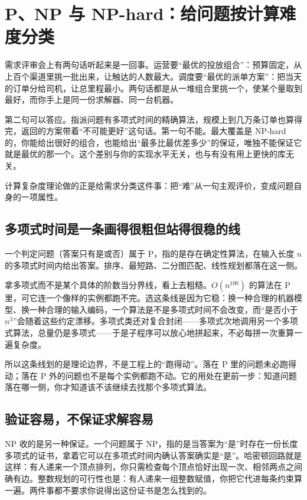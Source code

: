\section{P、NP 与 NP-hard：给问题按计算难度分类}
\label{sec:09-Convex-Optimization/09-Complexity-and-Approximation/01}

需求评审会上有两句话听起来是一回事。运营要``最优的投放组合''：预算固定，从上百个渠道里挑一批出来，让触达的人数最大。调度要``最优的派单方案''：把当天的订单分给司机，让总里程最小。两句话都是从一堆组合里挑一个，使某个量取到最好，而你手上是同一份求解器、同一台机器。

第二句可以答应。指派问题有多项式时间的精确算法，规模上到几万条订单也算得完，返回的方案带着``不可能更好''这句话。第一句不能。最大覆盖是 NP-hard 的，你能给出很好的组合，也能给出``最多比最优差多少''的保证，唯独不能保证它就是最优的那一个。这个差别与你的实现水平无关，也与有没有用上更快的库无关。

计算复杂度理论做的正是给需求分类这件事：把``难''从一句主观评价，变成问题自身的一项属性。

\subsection{多项式时间是一条画得很粗但站得很稳的线}

一个判定问题（答案只有是或否）属于 P，指的是存在确定性算法，在输入长度 \(n\) 的多项式时间内给出答案。排序、最短路、二分图匹配、线性规划都落在这一侧。

拿多项式而不是某个具体的阶数当分界线，看上去粗糙。\(O(n^{100})\) 的算法在 P 里，可它连一个像样的实例都跑不完。选这条线是因为它稳：换一种合理的机器模型、换一种合理的输入编码，一个算法是不是多项式时间不会改变，而``是否小于 \(n^3\)''会随着这些约定漂移。多项式类还对复合封闭——多项式次地调用另一个多项式算法，总量仍是多项式——于是子程序可以放心地拼起来，不必每拼一次重算一遍复杂度。

所以这条线划的是理论边界，不是工程上的``跑得动''。落在 P 里的问题未必跑得动；落在 P 外的问题也不是每个实例都跑不动。它的用处在更前一步：知道问题落在哪一侧，你才知道该不该继续去找那个多项式算法。

\subsection{验证容易，不保证求解容易}

NP 收的是另一种保证。一个问题属于 NP，指的是当答案为``是''时存在一份长度多项式的证书，拿着它可以在多项式时间内确认答案确实是``是''。哈密顿回路就是这样：有人递来一个顶点排列，你只需检查每个顶点恰好出现一次、相邻两点之间确有边。整数规划的可行性也是：有人递来一组整数赋值，你把它代进每条约束算一遍。两件事都不要求你说得出这份证书是怎么找到的。

